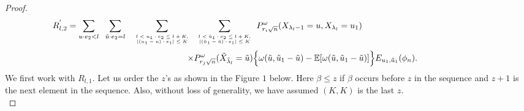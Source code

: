 \documentclass[11pt]{amsart}
\begin{document}
\begin{proof}
\[ R_{l,2}^{'} = \sum_{u\cdot e_2 <l}\hspace{0.2cm} \sum_{\tilde{u} \cdot e_2 =l} \hspace{0.2cm} \sum_{\begin{tiny}\begin{array}{c}l < u_1\cdot e_2 \leq l+K,\\ |(u_1-u)\cdot e_1| \leq K\end{array}\end{tiny}}   \sum_{\begin{tiny} \begin{array}{c}l < \tilde{u}_1\cdot e_2 \leq l+K,\\ |(\tilde{u}_1-\tilde{u})\cdot e_1| \leq K \end{array} \end{tiny}}  P_{r_i \sqrt{n}}^{\omega}(X_{\lambda_{l}-1} =u, X_{\lambda_l}=u_1)  \hspace{5cm}\]
\[\qquad \qquad \qquad  \qquad  \times  P_{r_j \sqrt{n}}^{\omega}(\tilde{X}_{\tilde{\lambda}_l}=\tilde{u})  \Big{\lbrace}\omega(\tilde{u},\tilde{u}_1-\tilde{u})-\mathbb{E}[\omega(\tilde{u},\tilde{u}_1-\tilde{u})] \Big{\rbrace} E_{u_1,\tilde{u}_1}(\phi_n). \]
We first work with $R_{l,1}$. Let us order the $z$'s as shown in the Figure $1$ below. Here $\beta \leq z$ if $\beta$ occurs before $z$ in the sequence and $z+1$ is the next element in the sequence. Also, without loss of generality, we have assumed $(K,K)$ is the last $z$.\\


\end{proof}
\end{document}
